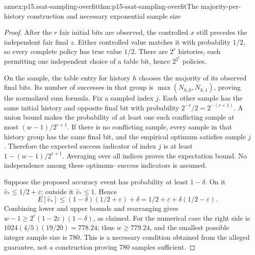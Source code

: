 \begin{annexitem}{annex:p15.ssat-sampling-overfit}{thm:p15-ssat-sampling-overfit}{The majority-per-history construction and necessary exponential sample size}
\begin{proof}
After the \(r\) fair initial bits are observed, the controlled
\(x\) still precedes the independent fair final \(z\). Either
controlled value matches it with probability \(1/2\), so every
complete policy has true value \(1/2\). There are \(2^r\)
histories, each permitting one independent choice of a table bit,
hence \(2^{2^r}\) policies.

On the sample, the table entry for history \(h\) chooses the
majority of its observed final bits. Its number of successes in that
group is \(\max(N_{h,0},N_{h,1})\), proving the normalized sum
formula. Fix a sampled index \(j\). Each other sample has the same
initial history and opposite final bit with probability
\(2^{-r}/2=2^{-(r+1)}\). A union bound makes the probability of
at least one such conflicting sample at most \((w-1)/2^{r+1}\).
If there is no conflicting sample, every sample in that history group
has the same final bit, and the empirical optimum satisfies sample
\(j\). Therefore the expected success indicator of index \(j\)
is at least \(1-(w-1)/2^{r+1}\). Averaging over all indices
proves the expectation bound. No independence among these optimum-
success indicators is assumed.

Suppose the proposed accuracy event has probability at least
\(1-\delta\). On it \(\widehat v_*\leq1/2+\varepsilon\);
outside it \(\widehat v_*\leq1\). Hence
\[
 E[\widehat v_*]\leq
 (1-\delta)(1/2+\varepsilon)+\delta
 =1/2+\varepsilon+\delta(1/2-\varepsilon).
\]
Combining lower and upper bounds and rearranging gives
\(w-1\geq2^r(1-2\varepsilon)(1-\delta)\), as claimed.
For the numerical case the right side is
\(1024(4/5)(19/20)=778.24\); thus \(w\geq779.24\), and
the smallest possible integer sample size is 780. This is a necessary
condition obtained from the alleged guarantee, not a construction
proving 780 samples sufficient.
\end{proof}
\end{annexitem}


